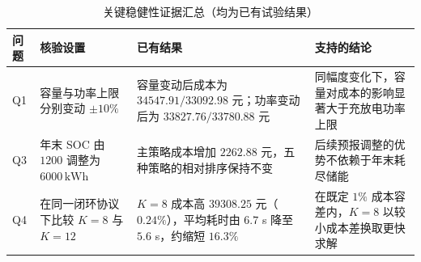 \begin{table}[htbp]
\centering
\caption{关键稳健性证据汇总（均为已有试验结果）}
\label{tab:robustness-evidence}
\begingroup
\setlength{\tabcolsep}{5pt}
\renewcommand{\arraystretch}{1.28}
\begin{tabularx}{0.98\linewidth}{@{}C{1.0cm}C{3.1cm}YY@{}}
\toprule
问题 & 核验设置 & 已有结果 & 支持的结论 \\
\midrule
Q1 & 容量与功率上限分别变动 $\pm10\%$
& 容量变动后成本为 $34547.91/33092.98$ 元；功率变动后为 $33827.76/33780.88$ 元
& 同幅度变化下，容量对成本的影响显著大于充放电功率上限 \\
Q3 & 年末 SOC 由 $1200$ 调整为 $6000\,\mathrm{kWh}$
& 主策略成本增加 $2262.88$ 元，五种策略的相对排序保持不变
& 后续预报调整的优势不依赖于年末耗尽储能 \\
Q4 & 在同一闭环协议下比较 $K=8$ 与 $K=12$
& $K=8$ 成本高 $39308.25$ 元（$0.24\%$），平均耗时由 $6.7$ s 降至 $5.6$ s，约缩短 $16.3\%$
& 在既定 $1\%$ 成本容差内，$K=8$ 以较小成本差换取更快求解 \\
\bottomrule
\end{tabularx}
\endgroup
\end{table}
